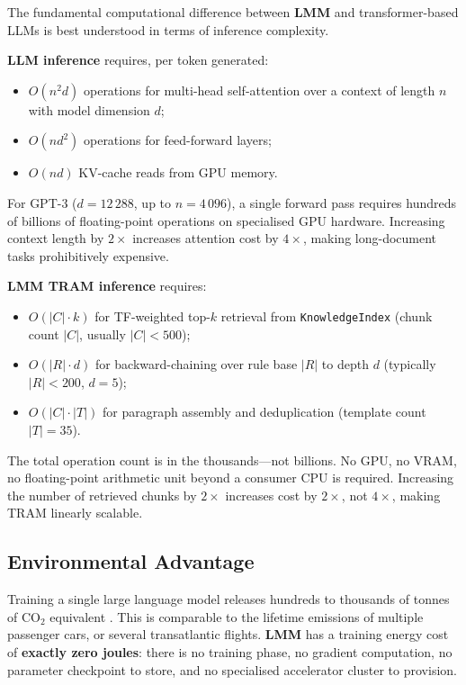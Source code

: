 \documentclass[11pt,a4paper]{article}
\newcommand{\lmm}{\texorpdfstring{%
  \textbf{\color{lmmAccent}LMM}}{LMM}}
\begin{document}
The fundamental computational difference between \lmm{} and transformer-based LLMs is best
understood in terms of inference complexity.

\textbf{LLM inference} requires, per token generated:
\begin{itemize}[noitemsep,topsep=4pt]
  \item $O(n^2 d)$ operations for multi-head self-attention over a context of length $n$ with
        model dimension $d$;
  \item $O(n d^2)$ operations for feed-forward layers;
  \item $O(n d)$ KV-cache reads from GPU memory.
\end{itemize}
For GPT-3 ($d=12\,288$, up to $n=4\,096$), a single forward pass requires hundreds of billions
of floating-point operations on specialised GPU hardware. Increasing context length by $2\times$
increases attention cost by $4\times$, making long-document tasks prohibitively expensive.

\textbf{\lmm{} TRAM inference} requires:
\begin{itemize}[noitemsep,topsep=4pt]
  \item $O(|C| \cdot k)$ for TF-weighted top-$k$ retrieval from \texttt{KnowledgeIndex}
        (chunk count $|C|$, usually $|C| < 500$);
  \item $O(|R| \cdot d)$ for backward-chaining over rule base $|R|$ to depth $d$ (typically
        $|R| < 200$, $d = 5$);
  \item $O(|C| \cdot |T|)$ for paragraph assembly and deduplication (template count $|T| = 35$).
\end{itemize}
The total operation count is in the thousands---not billions. No GPU, no VRAM, no floating-point
arithmetic unit beyond a consumer CPU is required. Increasing the number of retrieved chunks by
$2\times$ increases cost by $2\times$, not $4\times$, making TRAM linearly scalable.

\subsection{Environmental Advantage}

Training a single large language model releases hundreds to thousands of tonnes of CO$_2$
equivalent \citep{strubell2019energy,patterson2021carbon}. This is comparable to the lifetime
emissions of multiple passenger cars, or several transatlantic flights. \lmm{} has a training
energy cost of \textbf{exactly zero joules}: there is no training phase, no gradient computation,
no parameter checkpoint to store, and no specialised accelerator cluster to provision.
\end{document}
